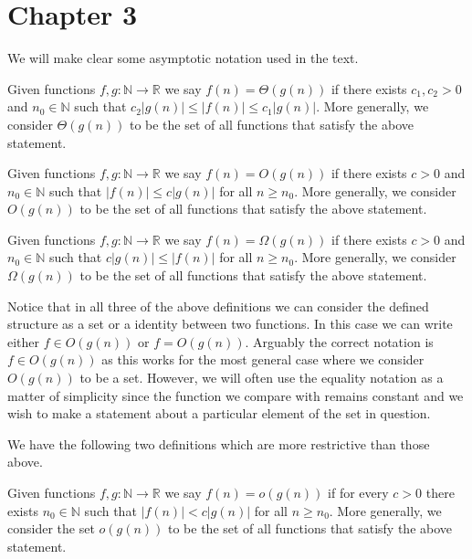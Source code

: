 \section{Chapter 3}

We will make clear some asymptotic notation used in the text.
\begin{definition}
	\label{def:big-theta}
	Given functions $f,g:\mathbb{N}\to\mathbb{R}$ we say $f(n) = \Theta(g(n))$ if there exists $c_{1},c_{2}>0$ and $n_{0}\in\mathbb{N}$ such that $c_{2}\left|g(n)\right|\leq \left|f(n)\right|\leq c_{1}\left|g(n)\right|$. More generally, we consider $\Theta(g(n))$ to be the set of all functions that satisfy the above statement.
\end{definition}

\begin{definition}
	\label{def:big-O}
	Given functions $f,g:\mathbb{N}\to\mathbb{R}$ we say $f(n)=O(g(n))$ if there exists $c>0$ and $n_{0}\in\mathbb{N}$ such that $\left|f(n)\right|\leq c\left|g(n)\right|$ for all $n\geq n_{0}$. More generally, we consider $O(g(n))$ to be the set of all functions that satisfy the above statement.
\end{definition}

\begin{definition}
	\label{def:big-omega}
	Given functions $f,g:\mathbb{N}\to\mathbb{R}$ we say $f(n)=\Omega(g(n))$ if there exists $c>0$ and $n_{0}\in\mathbb{N}$ such that $c\left|g(n)\right|\leq\left|f(n)\right|$ for all $n\geq n_{0}$. More generally, we consider $\Omega(g(n))$ to be the set of all functions that satisfy the above statement.
\end{definition}

Notice that in all three of the above definitions we can consider the defined structure as a set or a identity between two functions. In this case we can write either $f\in O(g(n))$ or $f=O(g(n))$. Arguably the correct notation is $f\in O(g(n))$ as this works for the most general case where we consider $O(g(n))$ to be a set. However, we will often use the equality notation as a matter of simplicity since the function we compare with remains constant and we wish to make a statement about a particular element of the set in question.

We have the following two definitions which are more restrictive than those above.
\begin{definition}
	\label{def:little-oh}
	Given functions $f,g:\mathbb{N}\to\mathbb{R}$ we say $f(n)=o(g(n))$ if for every $c>0$ there exists $n_{0}\in\mathbb{N}$ such that $\left|f(n)\right|<c \left|g(n)\right|$ for all $n\geq n_{0}$. More generally, we consider the set $o(g(n))$ to be the set of all functions that satisfy the above statement.
\end{definition}

